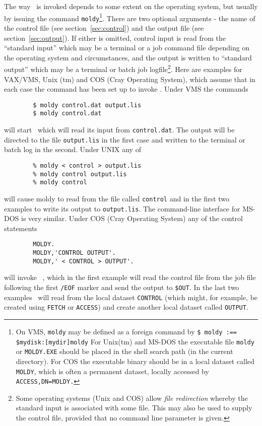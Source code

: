 The way \moldy\ is invoked depends to some extent on the operating
system, but usually by issuing the command \verb'moldy'\footnote{On
VMS, {\tt moldy} may be defined as a foreign command by {\tt \$ moldy
:== \$mydisk:[mydir]moldy} For Unix(tm) and MS-DOS the executable file
{\tt moldy} or {\tt MOLDY.EXE} should be placed in the shell search
path (\eg in the current directory). For COS the executable binary
should be in a local dataset called {\tt MOLDY}, which is often a
permanent dataset, locally accessed by {\tt ACCESS,DN=MOLDY.}}.  There
are two optional arguments - the name of the control file (see
section~\ref{sec:control}) and the output file (see
section~\ref{sec:output}).  If either is omitted, control input is
read from the ``standard input'' which may be a terminal or a job
command file depending on the operating system and circumstances, and
the output is written to ``standard output'' which may be a terminal
or batch job logfile\footnote{Some operating systems (Unix and COS)
allow {\em file redirection\/} whereby the standard input is
associated with some file.  This may also be used to supply the
control file, provided that no command line parameter is given.}.
Here are examples for VAX/VMS, Unix (tm) and COS (Cray Operating
System), which assume that in each case the command has been set up to
invoke \moldy. Under VMS the commands
\begin{verbatim}
        $ moldy control.dat output.lis
        $ moldy control.dat
\end{verbatim}
will start \moldy\  which will read its input from \verb'control.dat'.
The output will be directed to the file \verb'output.lis' in the first
case and written to the terminal or batch log in the second.  Under
UNIX any of
\begin{verbatim}
        % moldy < control > output.lis
        % moldy control output.lis
        % moldy control
\end{verbatim}
will cause moldy to read from the file called \verb'control' and in
the first two examples to write its output to \verb'output.lis'.  The
command-line interface for MS-DOS is very similar.  Under COS (Cray
Operating System) any of the control statements
\begin{verbatim}
        MOLDY.
        MOLDY,'CONTROL OUTPUT'.
        MOLDY,' < CONTROL > OUTPUT'.
\end{verbatim}
will invoke \moldy\ , which in the first example will read the control
file from the job file following the first \verb'/EOF' marker and send
the output to \verb'$OUT'.  In the last two examples
\moldy\  will read from the local dataset \verb'CONTROL' (which might, for
example, be created using \verb'FETCH' or \verb'ACCESS') and create
another local dataset called \verb'OUTPUT'.

